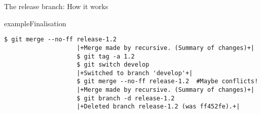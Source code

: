 \documentclass[usenames,svgnames,14pt]{beamer}
\begin{document}
\begin{frame}[fragile,c]{The release branch: How it works}
\begin{overlayarea}{\textwidth}{0.9\textheight}
\begin{onlyenv}
\begin{varblock}{example}{Finalisation}
\begin{lstlisting}[style=MyBash]
                    $ git merge --no-ff release-1.2
                    |+Merge made by recursive. (Summary of changes)+|
                    $ git tag -a 1.2
                    $ git switch develop
                    |+Switched to branch 'develop'+|
                    $ git merge --no-ff release-1.2  #Maybe conflicts!
                    |+Merge made by recursive. (Summary of changes)+|
                    $ git branch -d release-1.2
                    |+Deleted branch release-1.2 (was ff452fe).+|
                \end{lstlisting}
            \end{varblock}
        \end{onlyenv}
    \end{overlayarea}
\end{frame}

\end{document}
